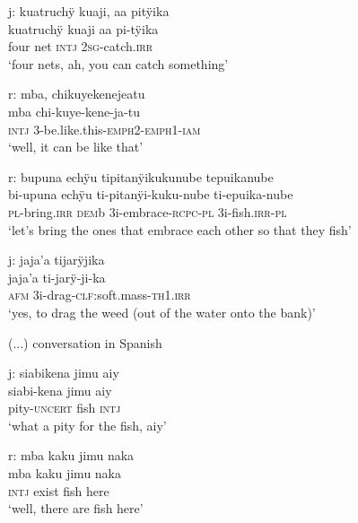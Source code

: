 \ea%
\begingl 
\glpreamble \textup{j:} kuatruchÿ kuaji, aa pitÿika\\
\gla kuatruchÿ kuaji aa pi-tÿika\\ 
\glb four net \textsc{intj} 2\textsc{sg}-catch.\textsc{irr}\\ 
\glft ‘four nets, ah, you can catch something’\\ 
\endgl
\xe


\ea%
\begingl 
\glpreamble \textup{r:} mba, chikuyekenejeatu\\
\gla mba chi-kuye-kene-ja-tu\\ 
\glb \textsc{intj} 3-be.like.this-\textsc{emph}2-\textsc{emph}1-\textsc{iam}\\ 
\glft ‘well, it can be like that’\\ 
\endgl
\xe

\ea%
\begingl 
\glpreamble \textup{r:}  bupuna echÿu tipitanÿikukunube tepuikanube\\
\gla bi-upuna echÿu ti-pitanÿi-kuku-nube ti-epuika-nube\\
\textsc{pl}-bring.\textsc{irr} \textsc{dem}b 3i-embrace-\textsc{rcpc}-\textsc{pl} 3i-fish.\textsc{irr}-\textsc{pl}\\
\glft ‘let’s bring the ones that embrace each other so that they fish’
\endgl
\xe

\ea%
\begingl 
\glpreamble \textup{j:} jaja’a tijarÿjika\\
\gla jaja’a ti-jarÿ-ji-ka\\ 
\glb \textsc{afm} 3i-drag-\textsc{clf:}soft.mass-\textsc{th}1\textsc{.irr}\\ 
\glft ‘yes, to drag the weed (out of the water onto the bank)’\\ 
\endgl
\xe

(...) conversation in Spanish


\ea%
\begingl 
\glpreamble \textup{j:} siabikena jimu aiy\\
\gla siabi-kena jimu aiy\\ 
\glb pity-\textsc{uncert} fish \textsc{intj}\\ 
\glft ‘what a pity for the fish, aiy’\\ 
\endgl
\xe


\ea%
\begingl 
\glpreamble \textup{r:} mba kaku jimu naka\\
\gla mba kaku jimu naka\\ 
\glb \textsc{intj} exist fish here\\ 
\glft ‘well, there are fish here’\\ 
\endgl
\xe

